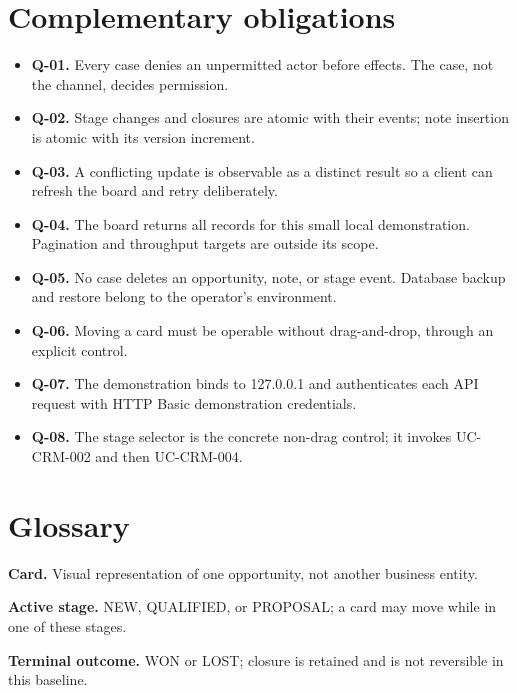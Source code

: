 \documentclass[10pt,a4paper]{article}
\begin{document}
\section{Complementary obligations}

\begin{itemize}

\item \textbf{Q-01.} Every case denies an unpermitted actor before effects. The case, not the channel, decides permission.

\item \textbf{Q-02.} Stage changes and closures are atomic with their events; note insertion is atomic with its version increment.

\item \textbf{Q-03.} A conflicting update is observable as a distinct result so a client can refresh the board and retry deliberately.

\item \textbf{Q-04.} The board returns all records for this small local demonstration. Pagination and throughput targets are outside its scope.

\item \textbf{Q-05.} No case deletes an opportunity, note, or stage event. Database backup and restore belong to the operator's environment.

\item \textbf{Q-06.} Moving a card must be operable without drag-and-drop, through an explicit control.

\item \textbf{Q-07.} The demonstration binds to 127.0.0.1 and authenticates each API request with HTTP Basic demonstration credentials.

\item \textbf{Q-08.} The stage selector is the concrete non-drag control; it invokes UC-CRM-002 and then UC-CRM-004.

\end{itemize}

\section{Glossary}

\textbf{Card.} Visual representation of one opportunity, not another business entity.

\textbf{Active stage.} NEW, QUALIFIED, or PROPOSAL; a card may move while in one of these stages.

\textbf{Terminal outcome.} WON or LOST; closure is retained and is not reversible in this baseline.
\end{document}

